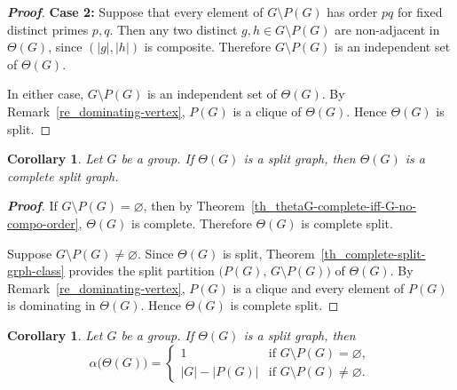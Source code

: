 \documentclass{amsart}
\theoremstyle{plain}
\newtheorem{corollary}[theorem]{Corollary}
\theoremstyle{definition}
\begin{document}
\begin{proof}[\textbf{Proof}]
\vspace{0.5mm}
\noindent \textbf{Case 2:} Suppose that every element of $G\setminus P(G)$ has order $pq$ for fixed distinct primes $p,q$. Then any two distinct $g,h \in G\setminus P(G)$ are non-adjacent in $\Theta(G)$, since $(|g|,|h|)$ is composite.
Therefore $G \setminus P(G)$ is an independent set of $\Theta(G)$.


\vspace{0.5mm}
In either case, $G \setminus P(G)$ is an independent set of $\Theta(G)$. By Remark~\ref{re_dominating-vertex}, $P(G)$ is a clique of $\Theta(G)$. Hence $\Theta(G)$ is split.	
\end{proof}


\begin{corollary}\label{cor_split-implies-complete-split}
Let $G$ be a group. If $\Theta(G)$ is a split graph, then $\Theta(G)$ is a complete split graph.
\end{corollary}

\begin{proof}[\textbf{Proof}]
If $G\setminus P(G) = \varnothing$, 
then by Theorem~\ref{th_thetaG-complete-iff-G-no-compo-order}, $\Theta(G)$ is complete. Therefore $\Theta(G)$ is complete split.

\vspace{0.4mm}
Suppose $G\setminus P(G) \neq \varnothing$. Since $\Theta(G)$ is split, Theorem~\ref{th_complete-split-grph-class} provides the split partition $\bigl(P(G),\,  G\setminus P(G)\bigr)$ of $\Theta(G)$. By Remark~\ref{re_dominating-vertex}, $P(G)$ is a clique and every element of $P(G)$ 
is dominating in $\Theta(G)$. Hence $\Theta(G)$ is complete split.
\end{proof}


\begin{corollary}\label{cor_ind-no-of-split-graph}
Let $G$ be a group. If $\Theta(G)$ is a split graph, then
\begin{equation*}
\alpha\bigl(\Theta(G)\bigr) =
	\begin{cases}
		1 & \text{if $G\setminus P(G) = \varnothing$},\\
		|G|- |P(G)| & \text{if $G\setminus P(G)\neq \varnothing$}.
	\end{cases}
\end{equation*}
 \end{corollary}
\end{document}
